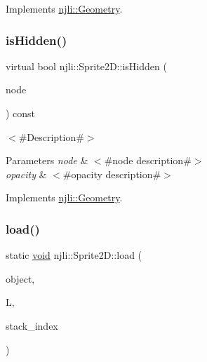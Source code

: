 Implements \mbox{\hyperlink{classnjli_1_1_geometry_a3780bbd093a4b163de3499e5726667f9}{njli\+::\+Geometry}}.

\mbox{\label{classnjli_1_1_sprite2_d_a875c4e8392568fdd347c9730aedde9a4}} 
\subsubsection{\texorpdfstring{is\+Hidden()}{isHidden()}}
{\footnotesize\ttfamily virtual bool njli\+::\+Sprite2\+D\+::is\+Hidden (\begin{DoxyParamCaption}\item[{\mbox{\hyperlink{classnjli_1_1_node}{Node}} $\ast$}]{node }\end{DoxyParamCaption}) const\hspace{0.3cm}{\ttfamily [virtual]}}

$<$\#\+Description\#$>$


\begin{DoxyParams}{Parameters}
{\em node} & $<$\#node description\#$>$ \\
\hline
{\em opacity} & $<$\#opacity description\#$>$ \\
\hline
\end{DoxyParams}


Implements \mbox{\hyperlink{classnjli_1_1_geometry_ac1ea8a16d541174a03addfa2dfede406}{njli\+::\+Geometry}}.

\mbox{\label{classnjli_1_1_sprite2_d_aba38ac28f9b1b82a4afeb04c088c212d}} 
\subsubsection{\texorpdfstring{load()}{load()}\hspace{0.1cm}{\footnotesize\ttfamily [1/2]}}
{\footnotesize\ttfamily static \mbox{\hyperlink{_thread_8h_af1e856da2e658414cb2456cb6f7ebc66}{void}} njli\+::\+Sprite2\+D\+::load (\begin{DoxyParamCaption}\item[{\mbox{\hyperlink{classnjli_1_1_sprite2_d}{Sprite2D}} \&}]{object,  }\item[{lua\+\_\+\+State $\ast$}]{L,  }\item[{int}]{stack\+\_\+index }\end{DoxyParamCaption})\hspace{0.3cm}{\ttfamily [static]}}

